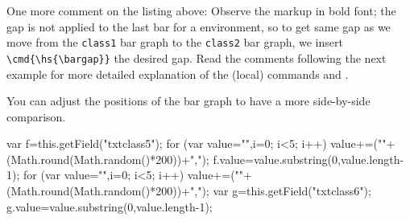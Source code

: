 \documentclass{article}
\begin{document}
One more comment on the
listing above: Observe the markup in bold font; the gap is not applied to the
last bar for a  environment, so to get same gap as we move from
the \texttt{class1} bar graph to the \texttt{class2} bar graph, we insert
\verb~\cmd{\hs{\bargap}}~ the desired gap. Read the comments following the next example
for more detailed explanation of the (local) commands  and .\medskip

You can adjust the positions of the bar graph to have a more side-by-side comparison.\vcgBdry[4bp]

\vcgBdry[6pt]


\begin{defineJS}{\pbaction}
var f=this.getField("txtclass5");
for (var value="",i=0; i<5; i++) value+=(""+(Math.round(Math.random()*200))+",");
f.value=value.substring(0,value.length-1);
for (var value="",i=0; i<5; i++) value+=(""+(Math.round(Math.random()*200))+",");
var g=this.getField("txtclass6");
g.value=value.substring(0,value.length-1);
\end{defineJS}
\end{document}
